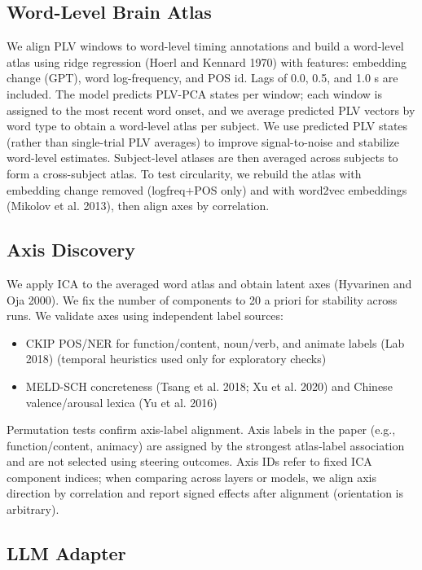 \documentclass[
]{article}
\begin{document}
\subsection{Word-Level Brain Atlas}\label{word-level-brain-atlas}

We align PLV windows to word-level timing annotations and build a
word-level atlas using ridge regression (Hoerl and Kennard 1970) with
features: embedding change (GPT), word log-frequency, and POS id. Lags
of 0.0, 0.5, and 1.0 s are included. The model predicts PLV-PCA states
per window; each window is assigned to the most recent word onset, and
we average predicted PLV vectors by word type to obtain a word-level
atlas per subject. We use predicted PLV states (rather than single-trial
PLV averages) to improve signal-to-noise and stabilize word-level
estimates. Subject-level atlases are then averaged across subjects to
form a cross-subject atlas. To test circularity, we rebuild the atlas
with embedding change removed (logfreq+POS only) and with word2vec
embeddings (Mikolov et al. 2013), then align axes by correlation.

\subsection{Axis Discovery}\label{axis-discovery}

We apply ICA to the averaged word atlas and obtain latent axes
(Hyvarinen and Oja 2000). We fix the number of components to 20 a priori
for stability across runs. We validate axes using independent label
sources:

\begin{itemize}
\item
  CKIP POS/NER for function/content, noun/verb, and animate labels (Lab
  2018) (temporal heuristics used only for exploratory checks)
\item
  MELD-SCH concreteness (Tsang et al. 2018; Xu et al. 2020) and Chinese
  valence/arousal lexica (Yu et al. 2016)
\end{itemize}

Permutation tests confirm axis-label alignment. Axis labels in the paper
(e.g., function/content, animacy) are assigned by the strongest
atlas‑label association and are not selected using steering outcomes.
Axis IDs refer to fixed ICA component indices; when comparing across
layers or models, we align axis direction by correlation and report
signed effects after alignment (orientation is arbitrary).

\subsection{LLM Adapter}\label{llm-adapter}
\end{document}
